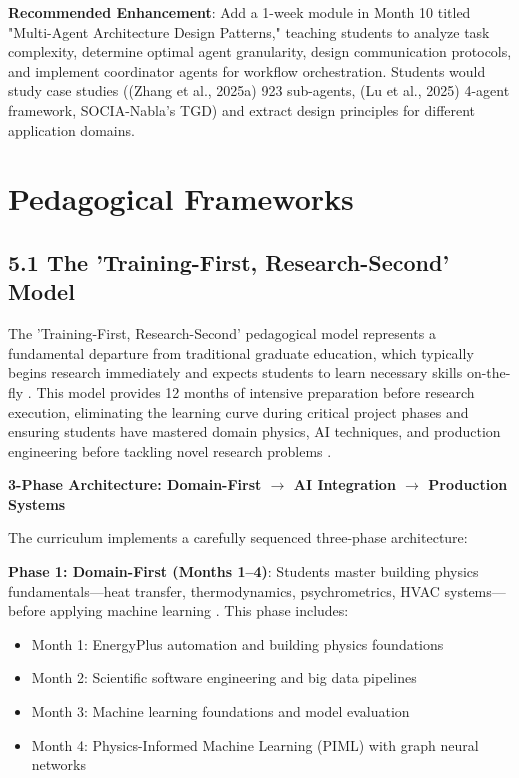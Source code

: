 \documentclass[12pt,a4paper]{article}
\begin{document}
\textbf{Recommended Enhancement}: Add a 1-week module in Month 10 titled "Multi-Agent Architecture Design Patterns," teaching students to analyze task complexity, determine optimal agent granularity, design communication protocols, and implement coordinator agents for workflow orchestration. Students would study case studies ((Zhang et al., 2025a) 923 sub-agents, (Lu et al., 2025) 4-agent framework, SOCIA-Nabla's TGD) and extract design principles for different application domains.



\section{Pedagogical Frameworks}

\subsection{5.1 The 'Training-First, Research-Second' Model}

The 'Training-First, Research-Second' pedagogical model represents a fundamental departure from traditional graduate education, which typically begins research immediately and expects students to learn necessary skills on-the-fly \cite{ref231}. This model provides 12 months of intensive preparation before research execution, eliminating the learning curve during critical project phases and ensuring students have mastered domain physics, AI techniques, and production engineering before tackling novel research problems \cite{ref232}.

\textbf{3-Phase Architecture: Domain-First $\rightarrow$ AI Integration $\rightarrow$ Production Systems}

The curriculum implements a carefully sequenced three-phase architecture:

\textbf{Phase 1: Domain-First (Months 1--4)}: Students master building physics fundamentals---heat transfer, thermodynamics, psychrometrics, HVAC systems---before applying machine learning \cite{ref233}. This phase includes:
\begin{itemize}
  \item Month 1: EnergyPlus automation and building physics foundations \cite{ref234}
  \item Month 2: Scientific software engineering and big data pipelines \cite{ref235}
  \item Month 3: Machine learning foundations and model evaluation \cite{ref236}
  \item Month 4: Physics-Informed Machine Learning (PIML) with graph neural networks \cite{ref237}
\end{itemize}
\end{document}
